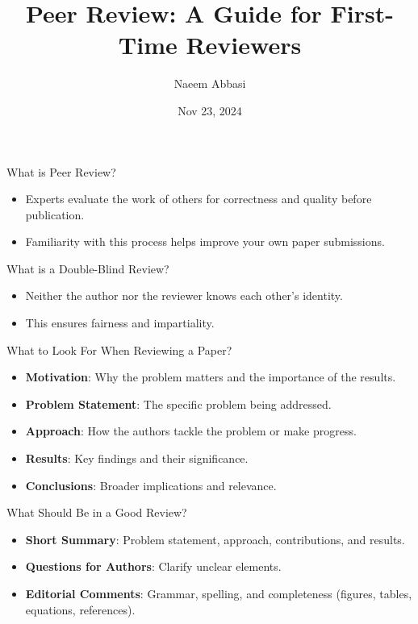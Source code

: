 \documentclass{beamer}
\title{Peer Review: A Guide for First-Time Reviewers}
\author{Naeem Abbasi}
\date{Nov 23, 2024}
\begin{document}
\frame{\titlepage}

\begin{frame}{What is Peer Review?}
    \begin{itemize}
        \item Experts evaluate the work of others for correctness and quality before publication.
        \item Familiarity with this process helps improve your own paper submissions.
    \end{itemize}
\end{frame}

\begin{frame}{What is a Double-Blind Review?}
    \begin{itemize}
        \item Neither the author nor the reviewer knows each other's identity.
        \item This ensures fairness and impartiality.
    \end{itemize}
\end{frame}

\begin{frame}{What to Look For When Reviewing a Paper?}
    \begin{itemize}
        \item \textbf{Motivation}: Why the problem matters and the importance of the results.
        \item \textbf{Problem Statement}: The specific problem being addressed.
        \item \textbf{Approach}: How the authors tackle the problem or make progress.
        \item \textbf{Results}: Key findings and their significance.
        \item \textbf{Conclusions}: Broader implications and relevance.
    \end{itemize}
\end{frame}

\begin{frame}{What Should Be in a Good Review?}
    \begin{itemize}
        \item \textbf{Short Summary}: Problem statement, approach, contributions, and results.
        \item \textbf{Questions for Authors}: Clarify unclear elements.
        \item \textbf{Editorial Comments}: Grammar, spelling, and completeness (figures, tables, equations, references).
    \end{itemize}
\end{frame}
\end{document}
